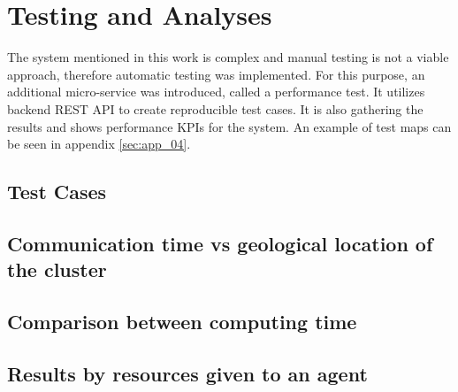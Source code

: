 \chapter{Testing and Analyses}
The system mentioned in this work is complex and manual testing is not a viable approach, therefore automatic testing was implemented. For this purpose, an additional micro-service was introduced, called a performance test. It utilizes backend REST API to create reproducible test cases. It is also gathering the results and shows performance KPIs for the system. An example of test maps can be seen in appendix \ref{sec:app_04}.

\section{Test Cases}


\section{Communication time vs geological location of the cluster}


\section{Comparison between computing time}


\section{Results by resources given to an agent}


